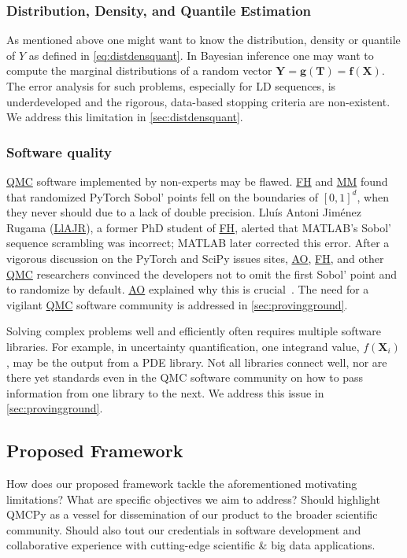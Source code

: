 \documentclass[11pt]{NSFamsart}
\newcommand{\cmtS}[1]{{\color{blue}{(Simon: #1)}}}
\newcommand{\FH}{\hyperlink{FHlink}{FH}\xspace}
\newcommand{\AO}{\hyperlink{AOlink}{AO}\xspace}
\newcommand{\MM}{\hyperlink{MMlink}{MM}\xspace}
\newcommand{\LlAJR}{\hyperlink{LlAJRlink}{LlAJR}\xspace}
\newcommand{\QMC}{\hyperlink{QMClink}{QMC}\xspace}
\newcommand{\SciPy}{SciPy\xspace}
\newcommand{\MATLAB}{MATLAB\xspace}
\newcommand{\PyTorch}{PyTorch\xspace}
\newcommand{\bff}{{\boldsymbol{f}}}
\newcommand{\bT}{{\boldsymbol{T}}}
\newcommand{\bX}{{\boldsymbol{X}}}
\newcommand{\bg}{{\boldsymbol{g}}}
\newcommand{\bY}{{\boldsymbol{Y}}}
\begin{document}
\subsubsection{Distribution, Density, and Quantile Estimation} As mentioned above one might want to know  the distribution, density or quantile of $Y$ as defined in \cref{eq:distdensquant}.  In Bayesian inference one may want to compute the marginal distributions of a random vector $\bY = \bg(\bT) = \bff(\bX)$.  The error analysis for such problems, especially for LD sequences, is underdeveloped and the rigorous, data-based stopping criteria are non-existent. We address this limitation in  \cref{sec:distdensquant}.

\subsubsection{Software quality} \QMC software implemented by non-experts may be flawed.  \FH and \MM found  that randomized \PyTorch Sobol' points fell on the boundaries of $[0,1]^d$, when they never should \cite{PyTorchFirstPt2020a} due to a lack of double precision.  \hypertarget{LlAJRlink}{Llu\'is Antoni Jim\'enez Rugama} (\LlAJR), a former PhD student of \FH,  alerted  that \MATLAB's Sobol' sequence scrambling was incorrect; \MATLAB later corrected this error.  After a vigorous discussion on the \PyTorch \cite{PyTorchFirstPt2020a} and  \SciPy  \cite{scipySobol2020a} issues sites, \AO, \FH, and other \QMC researchers convinced the developers not to omit the first Sobol' point and to randomize by default. \AO explained why this is crucial~\cite{owen2020dropping}.   The need for a vigilant \QMC software community is addressed in  \cref{sec:provingground}.

Solving complex problems well and efficiently often requires  multiple software libraries.  For example, in uncertainty quantification, one integrand value, $f(\bX_i)$, may be the output from a PDE  library.  Not all libraries connect well, nor are there yet standards even in the QMC software community on how to pass information from one library to the next.  We address this issue in   \cref{sec:provingground}.



\subsection{Proposed Framework} How does our proposed framework tackle the aforementioned motivating limitations? What are specific objectives we aim to address? Should highlight QMCPy as a vessel for dissemination of our product to the broader scientific community. Should also tout our credentials in software development and collaborative experience with cutting-edge scientific \& big data applications. \cmtS{add workflow figure going from applications to tasks.}
\end{document}
